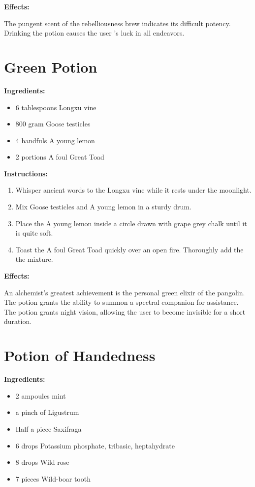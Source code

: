 \documentclass{article}
\begin{document}
\textbf{Effects:}

The pungent scent of the rebelliousness brew indicates its difficult potency. Drinking the potion causes the user 's luck in all endeavors.

\newpage
\section*{Green Potion}

\textbf{Ingredients:}

\begin{itemize}
  \item 6 tablespoons Longxu vine
  \item 800 gram Goose testicles
  \item 4 handfuls A young lemon
  \item 2 portions A foul Great Toad
\end{itemize}

\textbf{Instructions:}

\begin{enumerate}
  \item Whisper ancient words to the Longxu vine while it rests under the moonlight.
  \item Mix Goose testicles and A young lemon in a sturdy drum.
  \item Place the A young lemon inside a circle drawn with grape grey chalk until it is quite soft.
  \item Toast the A foul Great Toad quickly over an open fire. Thoroughly add the the mixture.
\end{enumerate}

\textbf{Effects:}

An alchemist's greatest achievement is the personal green elixir of the pangolin. The potion grants the ability to summon a spectral companion for assistance. The potion grants night vision, allowing the user to become invisible for a short duration.

\newpage
\section*{Potion of Handedness}

\textbf{Ingredients:}

\begin{itemize}
  \item 2 ampoules mint
  \item a pinch of Ligustrum
  \item Half a piece Saxifraga
  \item 6 drops Potassium phosphate, tribasic, heptahydrate
  \item 8 drops Wild rose
  \item 7 pieces Wild-boar tooth
\end{itemize}
\end{document}
